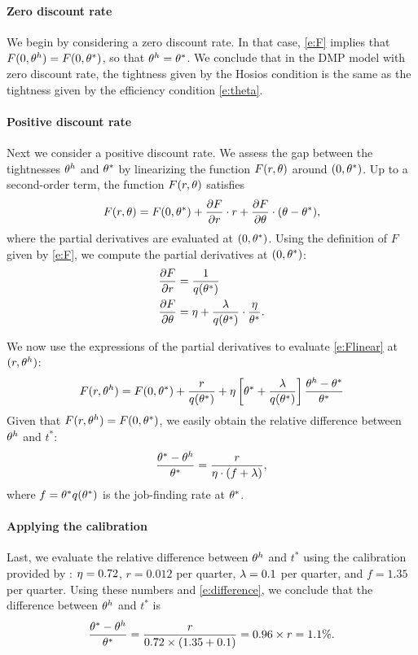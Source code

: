 \documentclass[letterpaper,12pt,leqno]{article}
\begin{document}
\paragraph{Zero discount rate} We begin by considering a zero discount rate. In that case, \eqref{e:F} implies that $F(0,\theta^h) = F(0,\theta^*)$, so that $\theta^h=\theta^*$. We conclude that in the DMP model with zero discount rate, the tightness given by the Hosios condition is the same as the tightness given by the efficiency condition \eqref{e:theta}.

\paragraph{Positive discount rate} Next we consider a positive discount rate. We assess the gap between the tightnesses $\theta^h$ and $\theta^*$ by linearizing the function $F(r,\theta)$ around $(0,\theta^*)$. Up to a second-order term, the function $F(r,\theta)$ satisfies
\begin{equation}
F(r,\theta) = F(0,\theta^*)+ \frac{\partial F}{\partial r} \cdot r + \frac{\partial F}{\partial \theta}\cdot (\theta-\theta^*),
\label{e:Flinear}\end{equation}
where the partial derivatives are evaluated at $(0,\theta^*)$. Using the definition of $F$ given by \eqref{e:F}, we compute the partial derivatives at $(0,\theta^*)$:
\begin{align*}
\frac{\partial F}{\partial r} &= \frac{1}{q(\theta^*)} \\
\frac{\partial F}{\partial \theta} &= \eta +  \frac{\lambda}{q(\theta^*)}\cdot \frac{\eta}{\theta^*}.
\end{align*}

We now use the expressions of the partial derivatives to evaluate \eqref{e:Flinear} at $(r,\theta^h)$:
\begin{equation*}
F(r,\theta^h) = F(0,\theta^*)+ \frac{r}{q(\theta^*)}  + \eta  \left[ \theta^* + \frac{\lambda}{q(\theta^*)}  \right]\frac{\theta^h-\theta^*}{\theta^*}
\end{equation*}
Given that $F(r,\theta^h) = F(0,\theta^*)$, we easily obtain the relative difference between $\theta^h$ and $t^*$:
\begin{equation}
\frac{\theta^*-\theta^h}{\theta^*} = \frac{r}{\eta \cdot\left( f +\lambda \right)},
\label{e:difference}\end{equation}
where $f = \theta^* q(\theta^*) $ is the job-finding rate at $\theta^*$. 

\paragraph{Applying the  calibration} Last, we evaluate the relative difference between $\theta^h$ and $t^*$ using the calibration provided by : $\eta = 0.72$, $r = 0.012$ per quarter, $\lambda = 0.1$ per quarter, and $f = 1.35$ per quarter.  Using these numbers and \eqref{e:difference}, we conclude that the difference between $\theta^h$ and $t^*$ is
\begin{equation*}
\frac{\theta^*-\theta^h}{\theta^*} = \frac{r}{0.72 \times \left( 1.35 + 0.1 \right)} = 0.96 \times r = 1.1\%.
\end{equation*}
\end{document}
